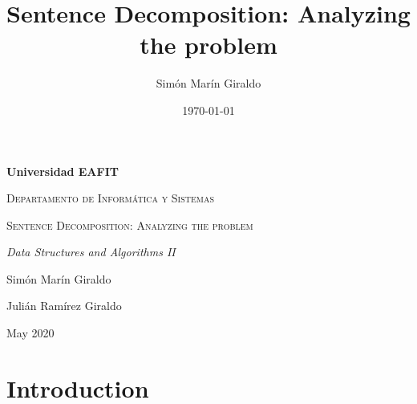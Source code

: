 \documentclass{article}
\title{Sentence Decomposition: Analyzing the problem}
\author{Simón Marín Giraldo}
\date{\today}
\begin{document}
	\begin{titlepage}
		\centering
		{\bfseries\LARGE Universidad EAFIT \par}
		\vspace{1cm}
		{\scshape\Large Departamento de Informática y Sistemas \par}
		\vspace{3cm}
		{\scshape\Huge Sentence Decomposition: Analyzing the problem \par}
		\vspace{3cm}
		{\itshape\Large Data Structures and Algorithms II \par}
		\vfill
		{\Large Simón Marín Giraldo \par}
		{\Large Julián Ramírez Giraldo \par}
		{\Large May 2020 \par}
	\end{titlepage}
	\newpage
	\tableofcontents
	\newpage
	\section{Introduction}
\end{document}
